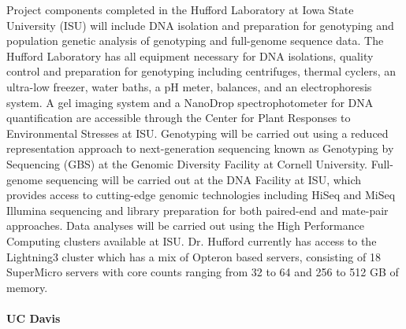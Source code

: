 Project components completed in the Hufford Laboratory at Iowa State University (ISU) will include DNA isolation and preparation for genotyping and population genetic analysis of genotyping and full-genome sequence data. The Hufford Laboratory has all equipment necessary for DNA isolations, quality control and preparation for genotyping including centrifuges, thermal cyclers, an ultra-low freezer, water baths, a pH meter, balances, and an electrophoresis system. A gel imaging system and a NanoDrop spectrophotometer for DNA quantification are accessible through the Center for Plant Responses to Environmental Stresses at ISU. Genotyping will be carried out using a reduced representation approach to next-generation sequencing known as Genotyping by Sequencing (GBS) at the Genomic Diversity Facility at Cornell University. Full-genome sequencing will be carried out at the DNA Facility at ISU, which provides access to cutting-edge genomic technologies including HiSeq and MiSeq Illumina sequencing and library preparation for both paired-end and mate-pair approaches. Data analyses will be carried out using the High Performance Computing clusters available at ISU. Dr. Hufford currently has access to the Lightning3 cluster which has a mix of Opteron based servers, consisting of 18 SuperMicro servers with core counts ranging from 32 to 64 and 256 to 512 GB of memory.

\paragraph{\textbf{UC Davis}}\

